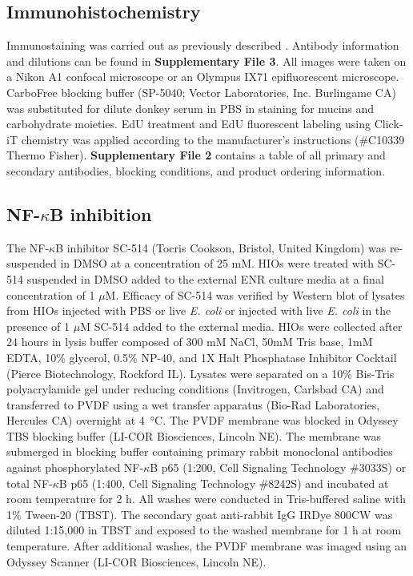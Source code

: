 \documentclass[9pt,lineo]{elife}
\begin{document}
\subsection*{{\bfseries\sffamily } Immunohistochemistry}
\label{sec:orgheadline19}
Immunostaining was carried out as previously described \citep{Finkbeiner:2015}. Antibody information and dilutions can be found in \textbf{Supplementary File 3}. All images were taken on a Nikon A1 confocal microscope or an Olympus IX71 epifluorescent microscope. CarboFree blocking buffer (SP-5040; Vector Laboratories, Inc. Burlingame CA) was substituted for dilute donkey serum in PBS in staining for mucins and carbohydrate moieties. EdU treatment and EdU fluorescent labeling using Click-iT chemistry was applied according to the manufacturer's instructions (\#C10339 Thermo Fisher). \textbf{Supplementary File 2} contains a table of all primary and secondary antibodies, blocking conditions, and product ordering information.
\subsection*{{\bfseries\sffamily } NF-\(\kappa\)B inhibition}
\label{sec:orgheadline20}
The NF-\(\kappa\)B inhibitor SC-514 \citep{Kishore:2003,Litvak:2009} (Tocris Cookson, Bristol, United Kingdom) was re-suspended in DMSO at a concentration of 25 mM. HIOs were treated with SC-514 suspended in DMSO added to the external ENR culture media at a final concentration of 1 \(\mu\)M. Efficacy of SC-514 was verified by Western blot of lysates from HIOs injected with PBS or live \emph{E. coli} or injected with live \emph{E. coli} in the presence of 1 \(\mu\)M SC-514 added to the external media. HIOs were collected after 24 hours in lysis buffer composed of 300 mM NaCl, 50mM Tris base, 1mM EDTA, 10\% glycerol, 0.5\% NP-40, and 1X Halt Phosphatase Inhibitor Cocktail (Pierce Biotechnology, Rockford IL). Lysates were separated on a 10\% Bis-Tris polyacrylamide gel under reducing conditions (Invitrogen, Carlsbad CA) and transferred to PVDF using a wet transfer apparatus (Bio-Rad Laboratories, Hercules CA) overnight at \SI{4}{\celsius}. The PVDF membrane was blocked in Odyssey TBS blocking buffer (LI-COR Biosciences, Lincoln NE). The membrane was submerged in blocking buffer containing primary rabbit monoclonal antibodies against phosphorylated NF-\(\kappa\)B p65 (1:200, Cell Signaling Technology \#3033S) or total NF-\(\kappa\)B p65 (1:400, Cell Signaling Technology \#8242S) and incubated at room temperature for 2 h. All washes were conducted in Tris-buffered saline with 1\% Tween-20 (TBST). The secondary goat anti-rabbit IgG IRDye 800CW was diluted 1:15,000 in TBST and exposed to the washed membrane for 1 h at room temperature. After additional washes, the PVDF membrane was imaged using an Odyssey Scanner (LI-COR Biosciences, Lincoln NE).
\end{document}
